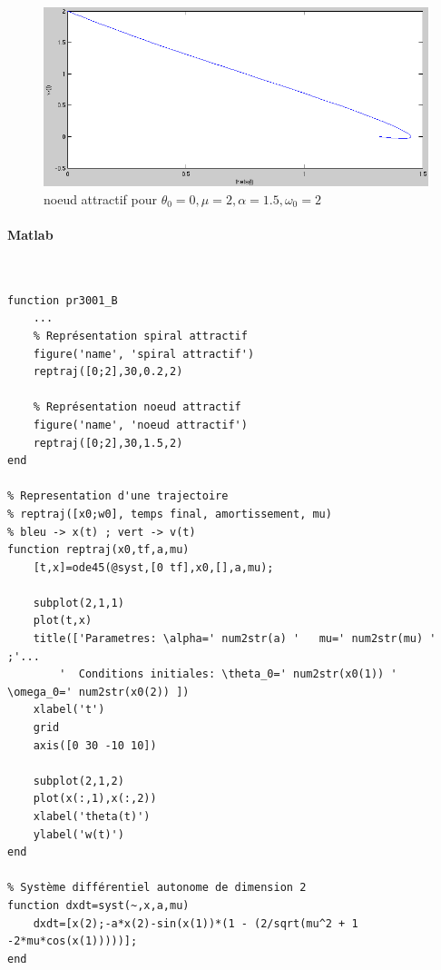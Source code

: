 \documentclass[11pt]{article}
\begin{document}
\begin{figure}[h!]
	\centering
	\includegraphics[scale=0.59]{Figures/rapport_traj_noeud.png}
	\caption{noeud attractif pour $\theta_0=0, \mu=2, \alpha=1.5,\omega_0=2$}
\end{figure}
\newpage

\paragraph{Matlab}\mbox{}\\
\begin{lstlisting}
function pr3001_B
	...
    % Représentation spiral attractif
    figure('name', 'spiral attractif')
    reptraj([0;2],30,0.2,2)
    
    % Représentation noeud attractif
    figure('name', 'noeud attractif')
    reptraj([0;2],30,1.5,2)
end

% Representation d'une trajectoire
% reptraj([x0;w0], temps final, amortissement, mu)
% bleu -> x(t) ; vert -> v(t)
function reptraj(x0,tf,a,mu)
    [t,x]=ode45(@syst,[0 tf],x0,[],a,mu);

    subplot(2,1,1)
    plot(t,x)
    title(['Parametres: \alpha=' num2str(a) '   mu=' num2str(mu) '  ;'...
        '  Conditions initiales: \theta_0=' num2str(x0(1)) '  \omega_0=' num2str(x0(2)) ])
    xlabel('t')
    grid
    axis([0 30 -10 10])
    
    subplot(2,1,2)
    plot(x(:,1),x(:,2))
    xlabel('theta(t)')
    ylabel('w(t)')
end

% Système différentiel autonome de dimension 2
function dxdt=syst(~,x,a,mu)
	dxdt=[x(2);-a*x(2)-sin(x(1))*(1 - (2/sqrt(mu^2 + 1 -2*mu*cos(x(1)))))];
end
\end{lstlisting}

\newpage

\appendix
\end{document}
